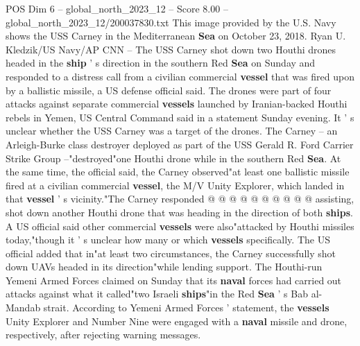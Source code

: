 \begin{textsample}{POS Dim 6 – global\_north\_2023\_12 – Score 8.00 – global\_north\_2023\_12/200037830.txt}  \label{ex:f6_pos_140}
This image provided by the U.S.
Navy shows the USS Carney in the Mediterranean \textbf{Sea} on October 23, 2018.
Ryan U.
Kledzik/US Navy/AP CNN -- The USS Carney shot down two Houthi drones headed in the \textbf{ship} ' s direction in the southern Red \textbf{Sea} on Sunday and responded to a distress call from a civilian commercial \textbf{vessel} that was fired upon by a ballistic missile, a US defense official said.
The drones were part of four attacks against separate commercial \textbf{vessels} launched by Iranian-backed Houthi rebels in Yemen, US Central Command said in a statement Sunday evening.
It ' s unclear whether the USS Carney was a target of the drones.
The Carney -- an Arleigh-Burke class destroyer deployed as part of the USS Gerald R.
Ford Carrier Strike Group --"destroyed"one Houthi drone while in the southern Red \textbf{Sea}.
At the same time, the official said, the Carney observed"at least one ballistic missile fired at a civilian commercial \textbf{vessel}, the M/V Unity Explorer, which landed in that \textbf{vessel} ' s vicinity."The Carney responded @ @ @ @ @ @ @ @ @ @ assisting, shot down another Houthi drone that was heading in the direction of both \textbf{ships}.
A US official said other commercial \textbf{vessels} were also"attacked by Houthi missiles today,"though it ' s unclear how many or which \textbf{vessels} specifically.
The US official added that in"at least two circumstances, the Carney successfully shot down UAVs headed in its direction"while lending support.
The Houthi-run Yemeni Armed Forces claimed on Sunday that its \textbf{naval} forces had carried out attacks against what it called"two Israeli \textbf{ships}"in the Red \textbf{Sea} ' s Bab al-Mandab strait.
According to Yemeni Armed Forces ' statement, the \textbf{vessels} Unity Explorer and Number Nine were engaged with a \textbf{naval} missile and drone, respectively, after rejecting warning messages.

\end{textsample}
